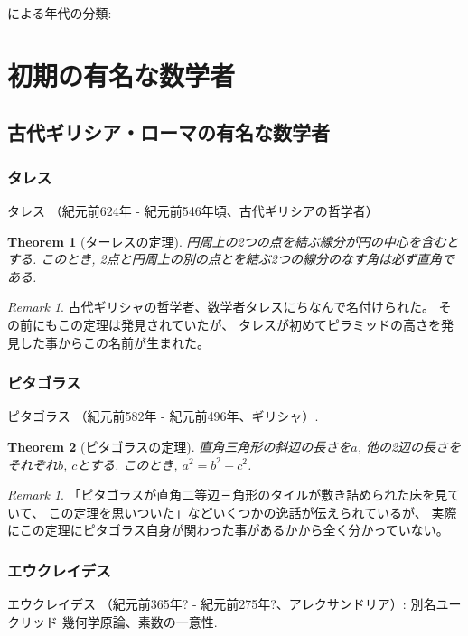 \documentclass[a4paper,12pt,dvipdfmx]{jsarticle}
\theoremstyle{plain}
\newtheorem{theoremX}{Theorem}
\theoremstyle{remark}  %
\newtheorem{remark}[thm]{Remark}
\theoremstyle{definition}  %
\begin{document}
\cite{wiki:数学者の一覧}による年代の分類:
\section{初期の有名な数学者}
\subsection{古代ギリシア・ローマの有名な数学者}
\subsubsection{タレス}
タレス\cite{wiki:タレス}
（紀元前624年 - 紀元前546年頃、古代ギリシアの哲学者）

\begin{theoremX}[ターレスの定理]
円周上の2つの点を結ぶ線分が円の中心を含むとする.
このとき,
2点と円周上の別の点とを結ぶ2つの線分のなす角は必ず直角である.
\end{theoremX}

\begin{remark}
古代ギリシャの哲学者、数学者タレスにちなんで名付けられた。
その前にもこの定理は発見されていたが、
タレスが初めてピラミッドの高さを発見した事からこの名前が生まれた。
\cite{wiki:タレスの定理}
\end{remark}


\subsubsection{ピタゴラス}
ピタゴラス\cite{wiki:ピタゴラス}
（紀元前582年 - 紀元前496年、ギリシャ）.

\begin{theoremX}[ピタゴラスの定理]
  直角三角形の斜辺の長さを$a$, 他の2辺の長さをそれぞれ$b$, $c$とする.
  このとき, $a^2=b^2+c^2$.
\end{theoremX}

\begin{remark}
「ピタゴラスが直角二等辺三角形のタイルが敷き詰められた床を見ていて、
  この定理を思いついた」などいくつかの逸話が伝えられているが、
実際にこの定理にピタゴラス自身が関わった事があるかから全く分かっていない。
\cite{wiki:ピタゴラスの定理}
\end{remark}

\subsubsection{エウクレイデス}
エウクレイデス
\cite{wiki:エウクレイデス}
（紀元前365年? - 紀元前275年?、アレクサンドリア）: 別名ユークリッド 幾何学原論、素数の一意性.
\end{document}

